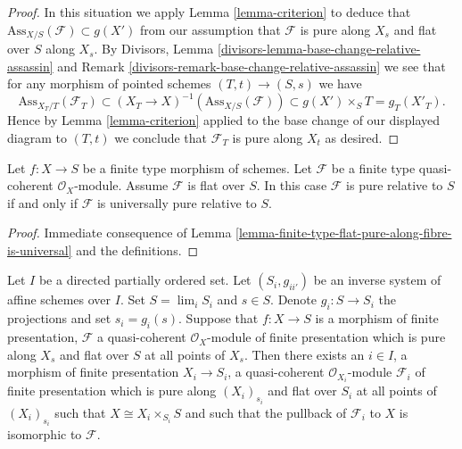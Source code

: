 \begin{proof}
\medskip\noindent
In this situation we apply
Lemma \ref{lemma-criterion}
to deduce that $\text{Ass}_{X/S}(\mathcal{F}) \subset g(X')$
from our assumption that $\mathcal{F}$ is pure along $X_s$
and flat over $S$ along $X_s$. By
Divisors, Lemma \ref{divisors-lemma-base-change-relative-assassin} and
Remark \ref{divisors-remark-base-change-relative-assassin}
we see that for any morphism of pointed schemes
$(T, t) \to (S, s)$ we have
$$
\text{Ass}_{X_T/T}(\mathcal{F}_T) \subset
(X_T \to X)^{-1}(\text{Ass}_{X/S}(\mathcal{F})) \subset
g(X') \times_S T = g_T(X'_T).
$$
Hence by
Lemma \ref{lemma-criterion}
applied to the base change of our displayed diagram to $(T, t)$
we conclude that $\mathcal{F}_T$ is pure along $X_t$ as desired.
\end{proof}

\begin{lemma}
\label{lemma-finite-type-flat-pure-is-universal}
Let $f : X \to S$ be a finite type morphism of schemes.
Let $\mathcal{F}$ be a finite type quasi-coherent $\mathcal{O}_X$-module.
Assume $\mathcal{F}$ is flat over $S$. In this case
$\mathcal{F}$ is pure relative to $S$ if and only if $\mathcal{F}$
is universally pure relative to $S$.
\end{lemma}

\begin{proof}
Immediate consequence of
Lemma \ref{lemma-finite-type-flat-pure-along-fibre-is-universal}
and the definitions.
\end{proof}

\begin{lemma}
\label{lemma-limit-purity}
Let $I$ be a directed partially ordered set.
Let $(S_i, g_{ii'})$ be an inverse system of affine schemes over $I$.
Set $S = \lim_i S_i$ and $s \in S$.
Denote $g_i : S \to S_i$ the projections and set $s_i = g_i(s)$.
Suppose that $f : X \to S$ is a morphism of finite presentation,
$\mathcal{F}$ a quasi-coherent $\mathcal{O}_X$-module of finite presentation
which is pure along $X_s$ and flat over $S$ at all points of $X_s$.
Then there exists an $i \in I$, a morphism of finite presentation
$X_i \to S_i$, a quasi-coherent $\mathcal{O}_{X_i}$-module $\mathcal{F}_i$
of finite presentation which is pure along $(X_i)_{s_i}$ and flat over $S_i$
at all points of $(X_i)_{s_i}$ such that $X \cong X_i \times_{S_i} S$
and such that the pullback of $\mathcal{F}_i$ to $X$ is isomorphic
to $\mathcal{F}$.
\end{lemma}

